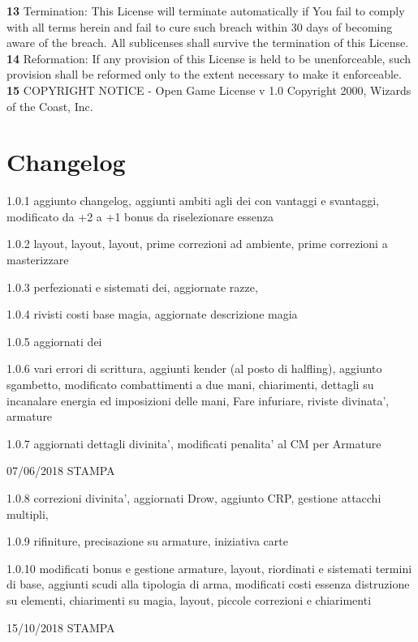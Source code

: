 \documentclass[a4paper,11pt,twoside,openany]{book}
\begin{document}
{{			\textbf{13} Termination: This License will terminate automatically if You fail to comply with all terms herein and fail to cure such breach within 30 days of becoming aware of the breach. All sublicenses shall survive the termination of this License.
			\textbf{14} Reformation: If any provision of this License is held to be unenforceable, such provision shall be reformed only to the extent necessary to make it enforceable.
			\textbf{15} COPYRIGHT NOTICE - Open Game License v 1.0 Copyright 2000, Wizards of the Coast, Inc. }
		
		\normalsize
		
		\pagebreak
		
		{\footnotesize 
			\section{Changelog}
			
			1.0.1 aggiunto changelog, aggiunti ambiti agli dei con vantaggi e svantaggi, modificato da +2 a +1 bonus da riselezionare essenza
			
			1.0.2 layout, layout, layout, prime correzioni ad ambiente, prime correzioni a masterizzare
			
			1.0.3 perfezionati e sistemati dei, aggiornate razze,
			
			1.0.4 rivisti costi base magia, aggiornate descrizione magia
			
			1.0.5 aggiornati dei
			
			1.0.6 vari errori di scrittura, aggiunti kender (al posto di halfling), aggiunto sgambetto, modificato combattimenti a due mani, chiarimenti, dettagli su incanalare energia ed imposizioni delle mani, Fare infuriare, riviste divinata', armature 
			
			1.0.7 aggiornati dettagli divinita', modificati penalita' al CM per Armature
			
			07/06/2018 STAMPA
			
			1.0.8 correzioni divinita', aggiornati Drow, aggiunto CRP, gestione attacchi multipli,
			
			1.0.9 rifiniture, precisazione su armature, iniziativa carte 
			
			1.0.10 modificati bonus e gestione armature, layout, riordinati e sistemati termini di base, aggiunti scudi alla tipologia di arma, modificati costi essenza distruzione su elementi, chiarimenti su magia, layout, piccole correzioni e chiarimenti
			
			15/10/2018 STAMPA
			
}}
\end{document}
